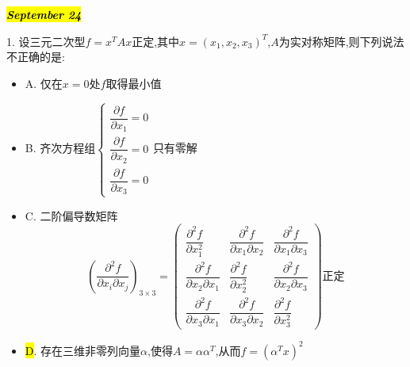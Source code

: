 \hl{\textbf{\textit{September 24}}}

1. 设三元二次型$f=x^{T}Ax$正定,其中$x=(x_{1},x_{2},x_{3})^{T}$,$A$为实对称矩阵,则下列说法不正确的是:  
\begin{itemize}
	\item A. 仅在$x=0$处$f$取得最小值
	\item B. 齐次方程组$\left\lbrace
	\begin{array}{l}
		\dfrac{\partial f}{\partial x_{1}}=0\\
		\dfrac{\partial f}{\partial x_{2}}=0\\
		\dfrac{\partial f}{\partial x_{3}}=0
	\end{array}
	\right. $只有零解
	\item C. 二阶偏导数矩阵
	$$\left( \dfrac{\partial^2 f}{\partial x_{i}\partial x_{j}}\right)_{3\times 3}=\left( \begin{matrix}
		\dfrac{\partial^2 f}{\partial x_{1}^2}&\dfrac{\partial^2 f}{\partial x_{1}\partial x_{2}}&\dfrac{\partial^2 f}{\partial x_{1}\partial x_{3}}\\
		\dfrac{\partial^2 f}{\partial x_{2}\partial x_{1}}&\dfrac{\partial^2 f}{\partial x_{2}^2}&\dfrac{\partial^2 f}{\partial x_{2}\partial x_{3}}\\
		\dfrac{\partial^2 f}{\partial x_{3}\partial x_{1}}&\dfrac{\partial^2 f}{\partial x_{3}\partial x_{2}}&\dfrac{\partial^2 f}{\partial x_{3}^2}
	\end{matrix}\right) \text{正定}$$
	\item \hl{D}. 存在三维非零列向量$\alpha$,使得$A=\alpha\alpha^{T}$,从而$f=(\alpha^{T}x)^2$
\end{itemize}
